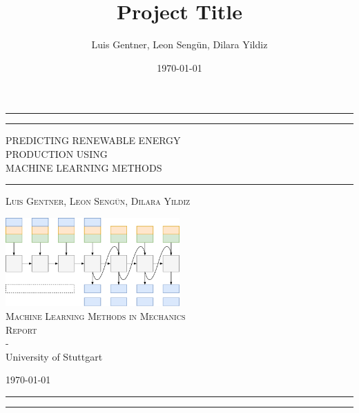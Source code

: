 \documentclass[11pt,table]{article}
\title{Project Title}
\author{Luis Gentner, Leon Sengün, Dilara Yildiz}
\date{\today}
\begin{document}
\begin{titlepage} 
	\centering 
	\rule{\textwidth}{1pt} 
	\vspace{2pt}\vspace{-\baselineskip} 
	\rule{\textwidth}{0.4pt} 
	\vspace{0.1\textheight} 
	
	
	{\Huge PREDICTING RENEWABLE ENERGY }\\[0.5\baselineskip] 
	{\Huge PRODUCTION USING }\\[0.5\baselineskip]
	{\Huge MACHINE LEARNING METHODS} 
	
	
	\vspace{0.025\textheight} 
	\rule{0.3\textwidth}{0.4pt} 
	\vspace{0.1\textheight}
	
    {\Large \textsc{Luis Gentner, Leon Sengün, Dilara Yildiz}} 
	
	\vfill 
	
 	\includegraphics[width=0.5\textwidth]{figures/autoreg-continous-notext.pdf} \\
	\vspace{0.05\textheight}
	{\large\textsc{Machine Learning Methods in Mechanics \\Report}\\ -\\ University of Stuttgart} 
	
	
	\vspace{0.1\textheight} 
	
	{\normalsize \today}
	
	
	\rule{\textwidth}{0.4pt}
	\vspace{2pt}\vspace{-\baselineskip}
	\rule{\textwidth}{1pt}
	
\end{titlepage}
\end{document}
